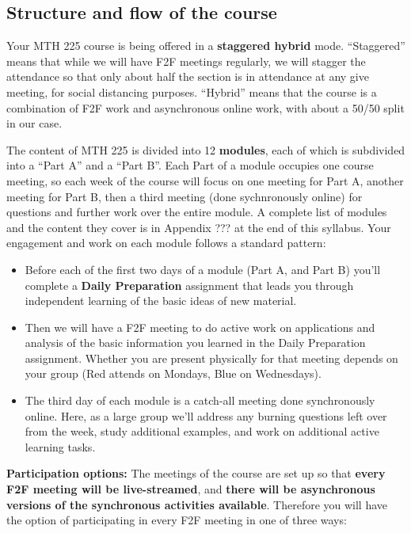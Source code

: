 \documentclass[]{article}
\providecommand{\tightlist}{%
  \setlength{\itemsep}{0pt}\setlength{\parskip}{0pt}}
\begin{document}
\hypertarget{structure-and-flow-of-the-course}{%
\subsection{Structure and flow of the
course}\label{structure-and-flow-of-the-course}}

Your MTH 225 course is being offered in a \textbf{staggered hybrid}
mode. ``Staggered'' means that while we will have F2F meetings
regularly, we will stagger the attendance so that only about half the
section is in attendance at any give meeting, for social distancing
purposes. ``Hybrid'' means that the course is a combination of F2F work
and asynchronous online work, with about a 50/50 split in our case.

The content of MTH 225 is divided into 12 \textbf{modules}, each of
which is subdivided into a ``Part A'' and a ``Part B''. Each Part of a
module occupies one course meeting, so each week of the course will
focus on one meeting for Part A, another meeting for Part B, then a
third meeting (done sychnronously online) for questions and further work
over the entire module. A complete list of modules and the content they
cover is in Appendix ??? at the end of this syllabus. Your engagement
and work on each module follows a standard pattern:

\begin{itemize}
\tightlist
\item
  Before each of the first two days of a module (Part A, and Part B)
  you'll complete a \textbf{Daily Preparation} assignment that leads you
  through independent learning of the basic ideas of new material.
\item
  Then we will have a F2F meeting to do active work on applications and
  analysis of the basic information you learned in the Daily Preparation
  assignment. Whether you are present physically for that meeting
  depends on your group (Red attends on Mondays, Blue on Wednesdays).
\item
  The third day of each module is a catch-all meeting done synchronously
  online. Here, as a large group we'll address any burning questions
  left over from the week, study additional examples, and work on
  additional active learning tasks.
\end{itemize}

\textbf{Participation options:} The meetings of the course are set up so
that \textbf{every F2F meeting will be live-streamed}, and \textbf{there
will be asynchronous versions of the synchronous activities available}.
Therefore you will have the option of participating in every F2F meeting
in one of three ways:
\end{document}
